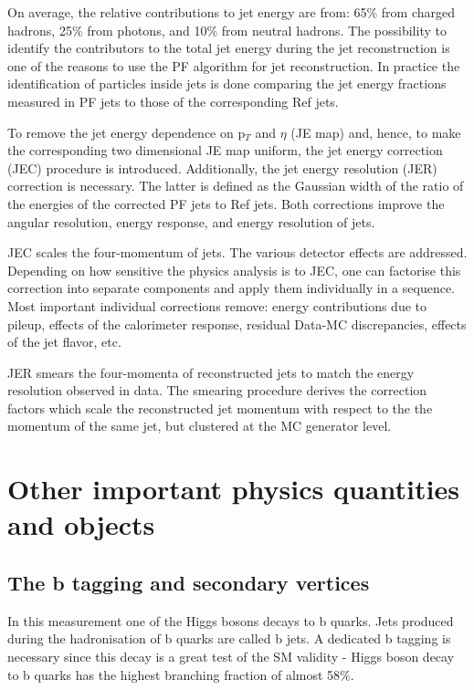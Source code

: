 \begin{small}
On average, the relative contributions to jet energy are from: 65$\%$ from charged hadrons, 25$\%$ from photons, and 10$\%$ from neutral hadrons. The possibility to identify the contributors to the total jet energy during the jet reconstruction is one of the reasons to use the PF algorithm for jet reconstruction. In practice the identification of particles inside jets is done comparing the jet energy fractions measured in PF jets to those of the corresponding Ref jets.

To remove the jet energy dependence on p$_T$ and $\eta$ (JE map) and, hence, to make the corresponding two dimensional JE map uniform, the jet energy correction (JEC) procedure is introduced. Additionally, the jet energy resolution (JER) correction is necessary. The latter is defined as the Gaussian width of the ratio of the energies of the corrected PF jets to Ref jets. Both corrections improve the angular resolution, energy response, and energy resolution of jets. 

JEC scales the four-momentum of jets. The various detector effects are addressed. Depending on how sensitive the physics analysis is to JEC, one can factorise this correction into separate components and apply them individually in a sequence. Most important individual corrections remove: energy contributions due to pileup, effects of the calorimeter response, residual Data-MC discrepancies, effects of the jet flavor, etc.

JER smears the four-momenta of reconstructed jets to match the energy resolution observed in data. The smearing procedure derives the correction factors which scale the reconstructed jet momentum with respect to the the momentum of the same jet, but clustered at the MC generator level.

\section{Other important physics quantities and objects}
\subsection{The b tagging and secondary vertices}\label{sec:btag}

In this measurement one of the Higgs bosons decays to b quarks. Jets produced during the hadronisation of b quarks  are called b jets. A dedicated b tagging is necessary since this decay is a great test of the SM validity - Higgs boson decay to b quarks has the highest branching fraction of almost 58$\%$. 


\end{small}
